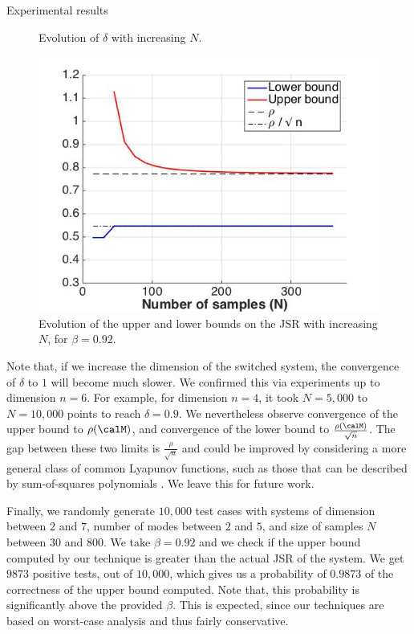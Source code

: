 \begin{subsection}{Experimental results}
\begin{figure}
\begin{center}
\caption{Evolution of $\delta$ with increasing $N$.}
\label{fig:11}
\end{center}
\end{figure}

\begin{figure}
\begin{center}
\includegraphics[trim = 5mm 5mm 5mm 5mm,scale=0.35]{bounds1.jpg}

\caption{Evolution of the upper and lower bounds on the JSR with increasing $N$, for $\beta=0.92$.}
\label{fig:21}
\end{center}
\end{figure}

Note that, if we increase the dimension of the switched system, the convergence of $\delta$ to $1$ will become much slower. We confirmed this via experiments up to dimension $n=6$. For example, for dimension $n=4$, it took $N=5,000$ to $N=10,000$ points to reach $\delta = 0.9$. We nevertheless observe convergence of the upper bound to $\rho(\calM)$, and convergence of the lower bound to $\frac{\rho(\calM)}{\sqrt{n}}$. The gap between these two limits is $\frac{\rho}{\sqrt{n}}$ and could be improved by considering a more general class of common Lyapunov functions, such as those that can be described by sum-of-squares polynomials \cite{sosLyap}. We leave this for future work.

Finally, we randomly generate $10,000$ test cases with systems of dimension between $2$ and $7$, number of modes between $2$ and $5$, and size of samples $N$ between $30$ and $800$. We take $\beta = 0.92$ and we check if the upper bound computed by our technique is greater than the actual JSR of the system. We get $9873$ positive tests, out of $10,000$, which gives us a probability of $0.9873$ of the correctness of the upper bound computed. Note that, this probability is significantly above the provided $\beta$. This is expected, since our techniques are based on worst-case analysis and thus fairly conservative.
\end{subsection}


